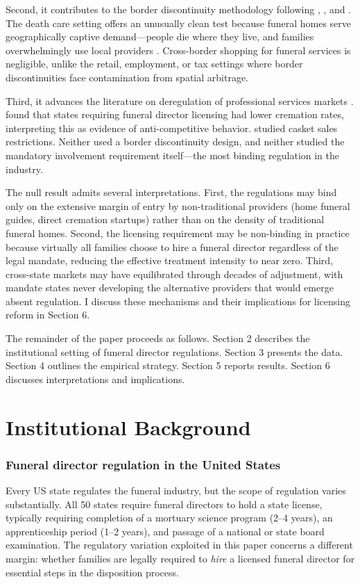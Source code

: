 \documentclass[12pt]{article}
\begin{document}
Second, it contributes to the border discontinuity methodology following \citet{dube2010minimum}, \citet{holmes1998effect}, and \citet{huang2018political}. The death care setting offers an unusually clean test because funeral homes serve geographically captive demand---people die where they live, and families overwhelmingly use local providers \citep{nfda2023statistics}. Cross-border shopping for funeral services is negligible, unlike the retail, employment, or tax settings where border discontinuities face contamination from spatial arbitrage.

Third, it advances the literature on deregulation of professional services markets \citep{harrington2002effects, chevalier2008compulsory}. \citet{harrington2002effects} found that states requiring funeral director licensing had lower cremation rates, interpreting this as evidence of anti-competitive behavior. \citet{chevalier2008compulsory} studied casket sales restrictions. Neither used a border discontinuity design, and neither studied the mandatory involvement requirement itself---the most binding regulation in the industry.

The null result admits several interpretations. First, the regulations may bind only on the extensive margin of entry by non-traditional providers (home funeral guides, direct cremation startups) rather than on the density of traditional funeral homes. Second, the licensing requirement may be non-binding in practice because virtually all families choose to hire a funeral director regardless of the legal mandate, reducing the effective treatment intensity to near zero. Third, cross-state markets may have equilibrated through decades of adjustment, with mandate states never developing the alternative providers that would emerge absent regulation. I discuss these mechanisms and their implications for licensing reform in Section 6.

The remainder of the paper proceeds as follows. Section 2 describes the institutional setting of funeral director regulations. Section 3 presents the data. Section 4 outlines the empirical strategy. Section 5 reports results. Section 6 discusses interpretations and implications.


\section{Institutional Background}

\subsubsection*{Funeral director regulation in the United States} Every US state regulates the funeral industry, but the scope of regulation varies substantially. All 50 states require funeral directors to hold a state license, typically requiring completion of a mortuary science program (2--4 years), an apprenticeship period (1--2 years), and passage of a national or state board examination. The regulatory variation exploited in this paper concerns a different margin: whether families are legally required to \textit{hire} a licensed funeral director for essential steps in the disposition process.
\end{document}
